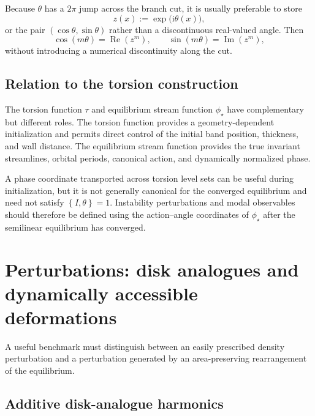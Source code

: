 \documentclass[11pt,a4paper]{article}
\newcommand{\bracket}[2]{\left\{#1,#2\right\}}
\begin{document}
Because $\theta$ has a $2\pi$ jump across the branch cut, it is usually preferable to store
\begin{equation}
  z(x):=\exp\bigl(\mathrm{i}\theta(x)\bigr),
  \label{eq:complex-phase-field}
\end{equation}
or the pair $(\cos\theta,\sin\theta)$ rather than a discontinuous real-valued angle. Then
\begin{equation}
  \cos(m\theta)=\operatorname{Re}(z^m),
  \qquad
  \sin(m\theta)=\operatorname{Im}(z^m),
\end{equation}
without introducing a numerical discontinuity along the cut.

\subsection{Relation to the torsion construction}

The torsion function $\tau$ and equilibrium stream function $\phi_\star$ have complementary but different roles. The torsion function provides a geometry-dependent initialization and permits direct control of the initial band position, thickness, and wall distance. The equilibrium stream function provides the true invariant streamlines, orbital periods, canonical action, and dynamically normalized phase.

A phase coordinate transported across torsion level sets can be useful during initialization, but it is not generally canonical for the converged equilibrium and need not satisfy $\bracket{I}{\theta}=1$. Instability perturbations and modal observables should therefore be defined using the action--angle coordinates of $\phi_\star$ after the semilinear equilibrium has converged.

\section{Perturbations: disk analogues and dynamically accessible deformations}

A useful benchmark must distinguish between an easily prescribed density perturbation and a perturbation generated by an area-preserving rearrangement of the equilibrium.

\subsection{Additive disk-analogue harmonics}
\end{document}
